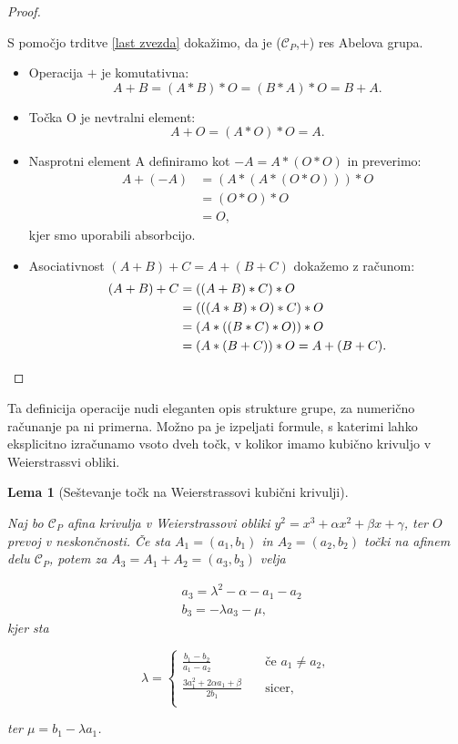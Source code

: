 \documentclass[12pt,a4paper,twoside]{article}
\theoremstyle{definition} %
\theoremstyle{plain} %
\newtheorem{lema}[definicija]{Lema}
\numberwithin{equation}{section}  %
\begin{document}
\begin{proof}~

S pomočjo trditve \ref{last zvezda} dokažimo, da je ($\mathcal{C}_P$,$+$) res Abelova grupa.

\begin{itemize}
\item Operacija $+$ je komutativna:
$$A+B = (A \ast B ) \ast O = (B \ast A) \ast O = B+A.$$
\item Točka O je nevtralni element:
$$A+O=(A \ast O) \ast O = A.$$
\item Nasprotni element A definiramo kot $-A = A \ast (O \ast O )$ in preverimo:
\begin{align}
A + (-A) &{} = (A \ast (A \ast (O \ast O))) \ast O \nonumber \\
&{} = (O \ast O) \ast O \nonumber \\
&{} = O, \nonumber
\end{align}
kjer smo uporabili absorbcijo.
\item Asociativnost $(A + B) + C = A + (B + C)$ dokažemo z računom:
\begin{align}
(A + B) + C &{} = ((A + B) \ast C) \ast O \nonumber \\
&{} = (((A \ast B) \ast O) \ast C) \ast O \nonumber \\
&{} = (A \ast ((B \ast C) \ast O)) \ast O \nonumber \\
&{} = (A \ast (B + C)) \ast O = A + (B + C). \nonumber \qedhere
\end{align}
\end{itemize}
\end{proof}

Ta definicija operacije nudi eleganten opis strukture grupe, za numerično računanje pa ni primerna. Možno pa je izpeljati formule, s katerimi lahko eksplicitno
izračunamo vsoto dveh točk, v kolikor imamo kubično krivuljo v Weierstrassvi obliki.

\begin{lema}[Seštevanje točk na Weierstrassovi kubični krivulji]~

\label{sestevanje}
Naj bo $\mathcal{C}_P$ afina krivulja v Weierstrassovi obliki $y^2 = x^3 + \alpha x^2 + \beta x + \gamma$, ter $O$ prevoj v neskončnosti. Če sta $A_1 = (a_1,b_1)$ in $A_2 = (a_2,b_2)$ točki na afinem delu $\mathcal{C}_P$, potem za $A_3 = A_1 + A_2 = (a_3,b_3)$ velja

\begin{align}
&{} a_3 = \lambda ^2 - \alpha - a_1 - a_2 \nonumber \\
&{} b_3 = -\lambda a_3 - \mu, \nonumber
\end{align}
kjer sta 

\[ \lambda =
\begin{cases}
\frac{b_1 - b_2}{a_1 - a_2} & \quad \text{če } a_1 \neq a_2 ,\\
\frac{3a_1^2+ 2 \alpha a_1 + \beta}{2b_1} & \quad \text{sicer} ,\\
\end{cases}
\]

ter $\mu = b_1 - \lambda a_1$.

\end{lema}
\end{document}
